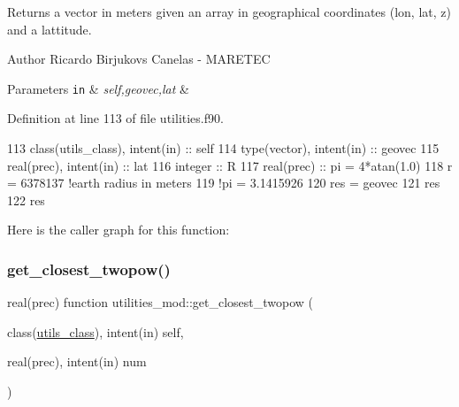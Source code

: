 Returns a vector in meters given an array in geographical coordinates (lon, lat, z) and a lattitude. 

\begin{DoxyAuthor}{Author}
Ricardo Birjukovs Canelas -\/ M\+A\+R\+E\+T\+EC 
\end{DoxyAuthor}

\begin{DoxyParams}[1]{Parameters}
\mbox{\tt in}  & {\em self,geovec,lat} & \\
\hline
\end{DoxyParams}


Definition at line 113 of file utilities.\+f90.


\begin{DoxyCode}
113     \textcolor{keywordtype}{class}(utils\_class), \textcolor{keywordtype}{intent(in)} :: self
114     \textcolor{keywordtype}{type}(vector), \textcolor{keywordtype}{intent(in)} :: geovec
115     \textcolor{keywordtype}{real(prec)}, \textcolor{keywordtype}{intent(in)} :: lat
116     \textcolor{keywordtype}{integer} :: R
117     \textcolor{keywordtype}{real(prec)} :: pi = 4*atan(1.0)
118     r = 6378137 \textcolor{comment}{!earth radius in meters}
119     \textcolor{comment}{!pi = 3.1415926}
120     res = geovec
121     res%
122     res%
\end{DoxyCode}
Here is the caller graph for this function\+:
\mbox{\label{namespaceutilities__mod_a164054d89c012d95f63c12a6cc0ac8d7}} 
\subsubsection{\texorpdfstring{get\+\_\+closest\+\_\+twopow()}{get\_closest\_twopow()}}
{\footnotesize\ttfamily real(prec) function utilities\+\_\+mod\+::get\+\_\+closest\+\_\+twopow (\begin{DoxyParamCaption}\item[{class(\mbox{\hyperlink{structutilities__mod_1_1utils__class}{utils\+\_\+class}}), intent(in)}]{self,  }\item[{real(prec), intent(in)}]{num }\end{DoxyParamCaption})\hspace{0.3cm}{\ttfamily [private]}}



